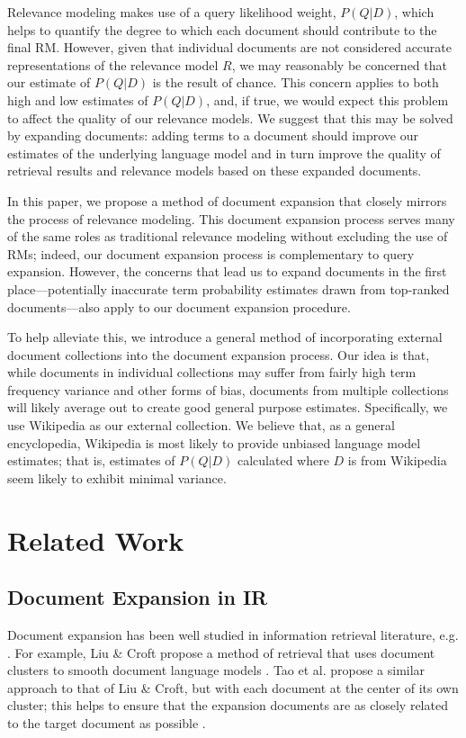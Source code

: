 \documentclass{sig-alternate}
\begin{document}
Relevance modeling makes use of a query likelihood weight, $P(Q|D)$, which helps to quantify the degree to which each document should contribute to the final RM. However, given that individual documents are not considered accurate representations of the relevance model $R$, we may reasonably be concerned that our estimate of $P(Q|D)$ is the result of chance. This concern applies to both high and low estimates of $P(Q|D)$, and, if true, we would expect this problem to affect the quality of our relevance models. We suggest that this may be solved by expanding documents: adding terms to a document should improve our estimates of the underlying language model and in turn improve the quality of retrieval results and relevance models based on these expanded documents.

In this paper, we propose a method of document expansion that closely mirrors the process of relevance modeling. This document expansion process serves many of the same roles as traditional relevance modeling without excluding the use of RMs; indeed, our document expansion process is complementary to query expansion. However, the concerns that lead us to expand documents in the first place---potentially inaccurate term probability estimates drawn from top-ranked documents---also apply to our document expansion procedure.

To help alleviate this, we introduce a general method of incorporating external document collections into the document expansion process. Our idea is that, while documents in individual collections may suffer from fairly high term frequency variance and other forms of bias, documents from multiple collections will likely average out to create good general purpose estimates. Specifically, we use Wikipedia as our external collection. We believe that, as a general encyclopedia, Wikipedia is most likely to provide unbiased language model estimates; that is, estimates of $P(Q|D)$ calculated where $D$ is from Wikipedia seem likely to exhibit minimal variance.

\section{Related Work}\label{section.related}

\subsection{Document Expansion in IR}\label{section.related.ir}

Document expansion has been well studied in information retrieval literature, e.g. \cite{Liu2004, Tao2006, Wei2006, Hubert2009, Singhal1999}. For example, Liu \& Croft propose a method of retrieval that uses document clusters to smooth document language models \cite{Liu2004}. Tao et al. propose a similar approach to that of Liu \& Croft, but with each document at the center of its own cluster; this helps to ensure that the expansion documents are as closely related to the target document as possible \cite{Tao2006}.
\end{document}
